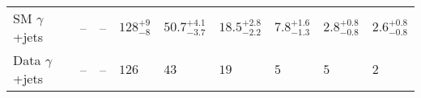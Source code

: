 \begin{table}[ht!]
\begin{tabular}{ lllllllll }
\hline
SM $\gamma$+jets\T      & --                             & --                             & $128^{+9}_{-8}$                & $50.7^{+4.1}_{-3.7}$           & $18.5^{+2.8}_{-2.2}$           & $7.8^{+1.6}_{-1.3}$            & $2.8^{+0.8}_{-0.8}$            & $2.6^{+0.8}_{-0.8}$            \\ 
Data $\gamma$+jets\B    & --                             & --                             & $126$                          & $43$                           & $19$                           & $5$                            & $5$                            & $2$                            \\ 
\hline
\end{tabular}
\end{table}

\newpage


